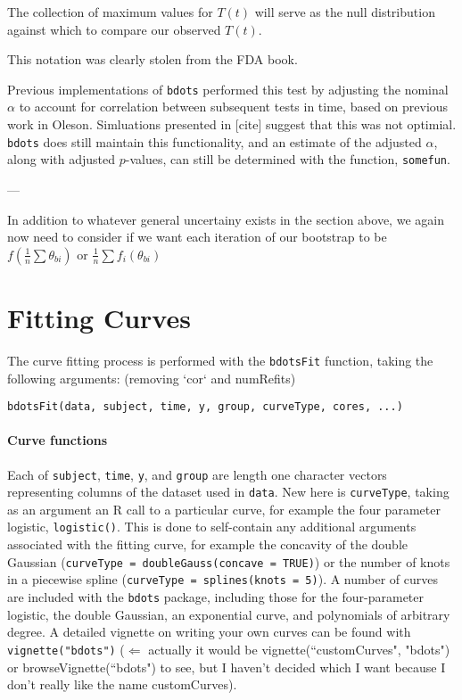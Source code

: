 \documentclass{article}
\begin{document}
The collection of maximum values for $T(t)$ will serve as the null distribution against which to compare our observed $T(t)$.

This notation was clearly stolen from the FDA book. 

Previous implementations of \texttt{bdots} performed this test by adjusting the nominal $\alpha$ to account for correlation between subsequent tests in time, based on previous work in Oleson. Simluations presented in [cite] suggest that this was not optimial. \texttt{bdots} does still maintain this functionality, and an estimate of the adjusted $\alpha$, along with adjusted $p$-values, can still be determined with the function, \texttt{somefun}.


---

In addition to whatever general uncertainy exists in the section above, we again now need to consider if we want each iteration of our bootstrap to be $f ( \frac1n \sum \theta_{bi})$ or $ \frac1n \sum f_i (\theta_{bi})$

\section{Fitting Curves}

The curve fitting process is performed with the \texttt{bdotsFit} function, taking the following arguments: (removing `cor` and numRefits)

\begin{center}
\begin{verbatim}
bdotsFit(data, subject, time, y, group, curveType, cores, ...)
\end{verbatim}
\end{center}

\paragraph{Curve functions} Each of \texttt{subject}, \texttt{time}, \texttt{y}, and \texttt{group} are length one character vectors representing columns of the dataset used in \texttt{data}. New here is \texttt{curveType}, taking as an argument an R call to a particular curve, for example the four parameter logistic, \texttt{logistic()}. This is done to self-contain any additional arguments associated with the fitting curve, for example the concavity of the double Gaussian (\texttt{curveType = doubleGauss(concave = TRUE)}) or the number of knots in a piecewise spline (\texttt{curveType = splines(knots = 5)}). A number of curves are included with the \texttt{bdots} package, including those for the four-parameter logistic, the double Gaussian, an exponential curve, and polynomials of arbitrary degree. A detailed vignette on writing your own curves can be found with \texttt{vignette("bdots")} ($\Leftarrow$ actually it would be vignette(``customCurves", "bdots") or browseVignette(``bdots") to see, but I haven't decided which I want because I don't really like the name customCurves).
\end{document}
